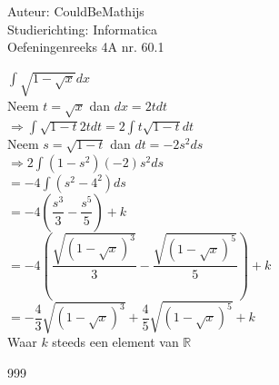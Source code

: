 \documentclass[a4paper]{article}
\newcommand{\intt}{\displaystyle\int}
\begin{document}
  
\noindent \large Auteur: CouldBeMathijs \\
\noindent \large Studierichting: Informatica\\
\noindent \large Oefeningenreeks 4A nr. 60.1\\

\medskip

\normalsize

$\intt \sqrt{1-\sqrt{x}}dx$\\

Neem $t = \sqrt{x}$ dan $dx = 2t dt$\\

$\Rightarrow \intt \sqrt{1-t}2tdt = 2 \intt t \sqrt{1-t}dt$\\

Neem $s = \sqrt{1-t}$ dan $dt = -2s^2ds$\\

$\Rightarrow 2 \intt (1-s^2)(-2)s^2 ds$ \\

$= -4 \intt (s^2 - 4^2)ds$\\

$=-4\left(\dfrac{s^3}{3}-\dfrac{s^5}{5}\right) + k$\\

$=-4\left(\dfrac{\sqrt{(1-\sqrt{x})^3}}{3}-\dfrac{\sqrt{(1-\sqrt{x})^5}}{5}\right) + k$\\

$=-\dfrac{4}{3}\sqrt{(1-\sqrt{x})^3} + \dfrac{4}{5} \sqrt{(1-\sqrt{x})^5} + k$\\

Waar $k$ steeds een element van $\mathbb{R}$


\begin{thebibliography}{999}
\end{thebibliography}
\end{document}
